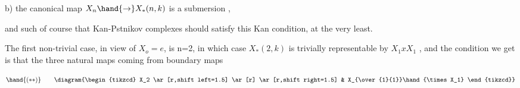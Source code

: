 b) the canonical map $X_n\hand{\to}X_*(n,k)$ is a submersion ,

and such of course that  Kan-Pstnikov complexes should satisfy this
Kan condition, at the very least.

The first non-trivial case, in view of $X_o=e$, is n=2, in which case
$X_*(2,k)$ is trivially representable by $X_1xX_1$ , and the condition we get
is that the three natural maps coming from boundary maps

\[
\hand{(**)}\qquad
\diagram{\begin{tikzcd} X_2 \ar[r,shift left=1.5] \ar[r] \ar[r,shift right=1.5] & X_{\over{1}{1}}\hand{\times X_1} \end{tikzcd}}
\]

